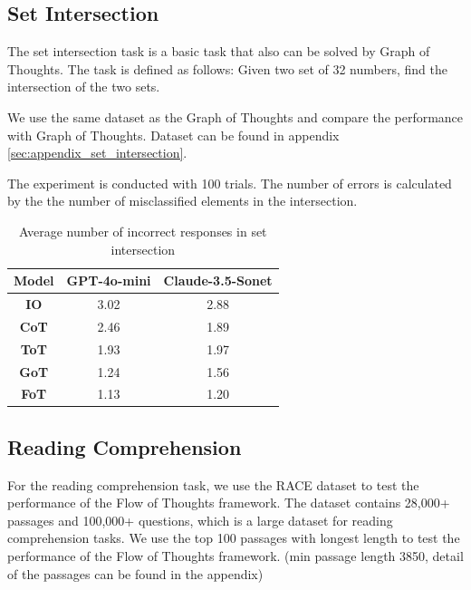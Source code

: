 \documentclass{article}
\begin{document}
\subsection{Set Intersection}

The set intersection task is a basic task that also can be solved by Graph of Thoughts. The task is defined as follows: Given two set of 32 numbers, find the intersection of the two sets.

We use the same dataset as the Graph of Thoughts and compare the performance with Graph of Thoughts. Dataset can be found in appendix \ref{sec:appendix_set_intersection}.

The experiment is conducted with 100 trials. The number of errors is calculated by the the number of misclassified elements in the intersection.

\begin{table}[h]
    \centering
    \begin{tabular}{|c|c|c|}
        \hline
        \textbf{Model} & \textbf{GPT-4o-mini} & \textbf{Claude-3.5-Sonet} \\
        \hline \hline
        \textbf{IO}    & 3.02                 & 2.88                     \\
        \textbf{CoT}   & 2.46                 & 1.89                     \\
        \textbf{ToT}   & 1.93                 & 1.97                     \\
        \textbf{GoT}   & 1.24                 & 1.56                     \\
        \textbf{FoT}   & 1.13                 & 1.20                     \\
        \hline
    \end{tabular}
    \vspace{1em}
    \caption{Average number of incorrect responses in set intersection}
    \label{tab:set_intersection_results}
\end{table}

\subsection{Reading Comprehension}

For the reading comprehension task, we use the RACE dataset \cite{lai2017large} to test the performance of the Flow of Thoughts framework. The dataset contains 28,000+ passages and 100,000+ questions, which is a large dataset for reading comprehension tasks. We use the top 100 passages with longest length to test the performance of the Flow of Thoughts framework. (min passage length 3850, detail of the passages can be found in the appendix)
\end{document}
